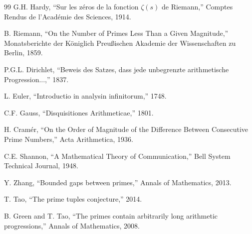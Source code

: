 \documentclass[12pt,a4paper]{report}
\begin{document}
\begin{thebibliography}{99}
 G.H. Hardy, ``Sur les zéros de la fonction $\zeta(s)$ de Riemann,'' Comptes Rendus de l'Académie des Sciences, 1914.

 B. Riemann, ``On the Number of Primes Less Than a Given Magnitude,'' Monatsberichte der Königlich Preußischen Akademie der Wissenschaften zu Berlin, 1859.

 P.G.L. Dirichlet, ``Beweis des Satzes, dass jede unbegrenzte arithmetische Progression...,'' 1837.

 L. Euler, ``Introductio in analysin infinitorum,'' 1748.

 C.F. Gauss, ``Disquisitiones Arithmeticae,'' 1801.

 H. Cramér, ``On the Order of Magnitude of the Difference Between Consecutive Prime Numbers,'' Acta Arithmetica, 1936.

 C.E. Shannon, ``A Mathematical Theory of Communication,'' Bell System Technical Journal, 1948.

 Y. Zhang, ``Bounded gaps between primes,'' Annals of Mathematics, 2013.

 T. Tao, ``The prime tuples conjecture,'' 2014.

 B. Green and T. Tao, ``The primes contain arbitrarily long arithmetic progressions,'' Annals of Mathematics, 2008.
\end{thebibliography}
\end{document}
